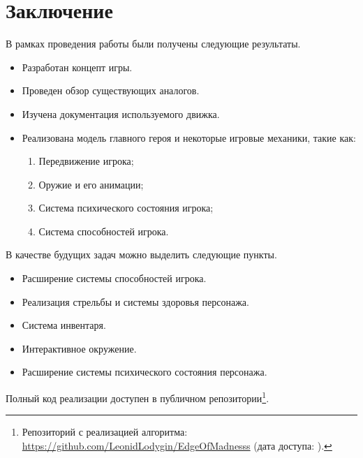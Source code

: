 
\section*{Заключение}
В рамках проведения работы были получены следующие результаты.

\begin{itemize}
\item Разработан концепт игры.
\item Проведен обзор существующих аналогов.
\item Изучена документация используемого движка.
\item Реализована модель главного героя и некоторые игровые механики, такие как:
    \begin{enumerate}
       \item  Передвижение игрока;
       \item  Оружие и его анимации;
       \item  Система психического состояния игрока;
       \item  Система способностей игрока.
    \end{enumerate}   
\end{itemize}

\noindent В качестве будущих задач можно выделить следующие пункты.
\begin{itemize}
\item Расширение системы способностей игрока.
\item Реализация стрельбы и системы здоровья персонажа.
\item Система инвентаря.
\item Интерактивное окружение.
\item Расширение системы психического состояния персонажа.
\end{itemize}

Полный код реализации доступен в публичном репозитории\footnote{Репозиторий с реализацией алгоритма: \url{https://github.com/LeonidLodygin/EdgeOfMadnesss} (дата доступа:   ).}.
